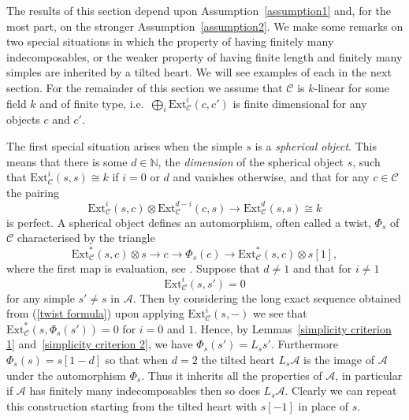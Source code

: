 \documentclass{article}
\theoremstyle{plain}
\theoremstyle{definition}
\theoremstyle{remark}
\newcommand{\defn}[1]{\emph{#1}}
\newcommand{\ie}{i.e.\ }
\newcommand{\N}{\mathbb{N}}
\newcommand{\cat}[1]{\mathcal{#1}}
\newcommand{\Ext}[4]{{\mathrm{Ext}_{#1}^{#2}}(#3,#4)}
\begin{document}
The results of this section depend upon Assumption~\ref{assumption1} and, for the most part, on the stronger  Assumption~\ref{assumption2}. We make some remarks on two special situations in which the property of having finitely many indecomposables, or the weaker property of having finite length and finitely many simples are inherited by a tilted heart. We will see examples of each in the next section. For the remainder of this section we assume that $\cat{C}$ is $k$-linear for some field $k$ and of finite type, \ie $\bigoplus_i \Ext{\cat{C}}{i}{c}{c'}$ is finite dimensional for any objects $c$ and $c'$. 

\label{spherical remarks}
The first special situation arises when the simple $s$ is a \defn{spherical object}. This means that there is some $d\in \N$, the \defn{dimension} of the spherical object $s$, such that $\Ext{\cat{C}}{i}{s}{s}\cong k$ if $i=0$ or $d$ and vanishes otherwise, and that for any $c\in \cat{C}$ the pairing 
$$
\Ext{\cat{C}}{i}{s}{c}\otimes \Ext{\cat{C}}{d-i}{c}{s} \to \Ext{\cat{C}}{d}{s}{s} \cong k
$$
is perfect. A spherical object defines an automorphism, often called a twist, $\Phi_s$ of $\cat{C}$ characterised by the triangle
\begin{equation}
\label{twist formula}
\Ext{\cat{C}}{*}{s}{c}\otimes s \to c\to \Phi_s(c) \to \Ext{\cat{C}}{*}{s}{c}\otimes s[1],
\end{equation}
where the first map is evaluation, see \cite{MR1831820}. Suppose that $d\neq 1$ and that for $i\neq 1$
 $$
\Ext{\cat{C}}{i}{s}{s'}=0
$$
for any simple $s'\neq s$ in $\cat{A}$. Then by considering the long exact sequence obtained from (\ref{twist formula}) upon applying $\Ext{\cat{C}}{i}{s}{-}$ we see that $\Ext{\cat{C}}{*}{s}{\Phi_s(s')}=0$ for $i=0$ and $1$. Hence, by Lemmas~\ref{simplicity criterion 1} and~\ref{simplicity criterion 2}, we have $\Phi_s(s')=L_ss' $. Furthermore $\Phi_s(s) = s[1-d]$ so that when $d=2$ the tilted heart $L_s\cat{A}$ is the image of $\cat{A}$ under the automorphism $\Phi_s$. Thus it inherits all the properties of $\cat{A}$, in particular if $\cat{A}$ has finitely many indecomposables then so does $L_s\cat{A}$. Clearly we can repeat this construction starting from the tilted heart with $s[-1]$ in place of $s$.  
\end{document}
